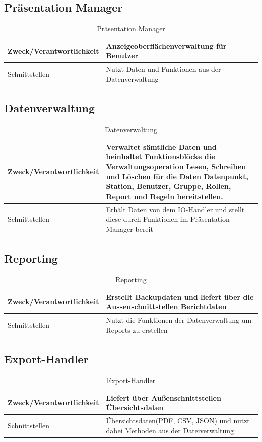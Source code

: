 \subsection{Präsentation Manager}
\begin{table}[th]
	\begin{tabularx}{\textwidth}{X X}
		\hline
		Zweck/Verantwortlichkeit & Anzeigeoberflächenverwaltung für Benutzer \\
		\hline
		Schnittstellen & Nutzt Daten und Funktionen aus der Datenverwaltung\\
		\hline
	\end{tabularx} 
	\caption{Präsentation Manager}
	\label{tab:Präsentation Manager}
\end{table}

\subsection{Datenverwaltung}
\begin{table}[th]
	\begin{tabularx}{\textwidth}{X X}
		\hline
		Zweck/Verantwortlichkeit & Verwaltet sämtliche Daten und beinhaltet Funktionsblöcke die Verwaltungsoperation Lesen, Schreiben und Löschen für die Daten Datenpunkt, Station, Benutzer, Gruppe, Rollen, Report und Regeln bereitstellen. \\
		\hline
		Schnittstellen & Erhält Daten von dem IO-Handler und stellt diese durch Funktionen im Präsentation Manager bereit\\
		\hline
	\end{tabularx} 
	\caption{Datenverwaltung}
	\label{Datenverwaltung}
\end{table}
\clearpage
\subsection{Reporting}
\begin{table}[th]
	\begin{tabularx}{\textwidth}{p{5cm} X}
		\hline
		Zweck/Verantwortlichkeit & Erstellt Backupdaten und liefert über die Aussenschnittstellen Berichtdaten \\
		\hline
		Schnittstellen & Nutzt die Funktionen der Datenverwaltung um Reports zu erstellen\\
		\hline
	\end{tabularx} 
	\caption{Reporting}
	\label{tab:Reporting}
\end{table}

\subsection{Export-Handler}
\begin{table}[th]
	\begin{tabularx}{\textwidth}{p{5cm} X}
		\hline
		Zweck/Verantwortlichkeit & Liefert über Außenschnittstellen Übersichtsdaten \\
		\hline
		Schnittstellen & Übersichtsdaten(PDF, CSV, JSON) und nutzt dabei Methoden aus der Dateiverwaltung\\
		\hline
	\end{tabularx} 
	\caption{Export-Handler}
	\label{tab:ExportHandler}
\end{table}

